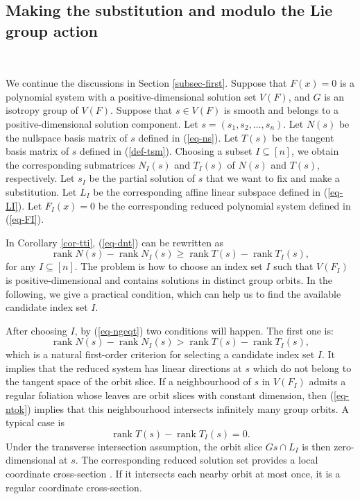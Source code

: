 \documentclass[reqno]{amsart}
\theoremstyle{definition}
\numberwithin{equation}{section}
\theoremstyle{remark}
\newcounter{condition}
\begin{document}
\subsection{Making the substitution and modulo the Lie group action}
\label{subsec-ntmethod}
\

We continue the discussions in Section \ref{subsec-first}. Suppose that
$F(x)=0$ is a polynomial system with a positive-dimensional solution set
$V(F)$, and $G$ is an isotropy group of $V(F)$. Suppose that $s\in V(F)$ is smooth and belongs to a positive-dimensional solution component. Let $s=(s_1,s_2,\ldots,s_n)$. Let $N(s)$ be the nullspace basis matrix of $s$ defined in (\ref{eq-ns}). Let $T(s)$ be the tangent basis matrix of $s$ defined in (\ref{def-tsm}). Choosing a subset $I\subseteq [n]$, we obtain the corresponding submatrices $N_I(s)$ and $T_I(s)$ of  $N(s)$ and $T(s)$, respectively. Let $s_I$ be the partial solution of $s$ that we want to fix and make a substitution. Let $L_I$ be the corresponding affine linear subspace defined in (\ref{eq-LI}). Let $F_I(x)=0$ be the corresponding reduced polynomial system defined in (\ref{eq-FI}).

In Corollary \ref{cor-tti}, (\ref{eq-dnt}) can be rewritten as 
\begin{equation}\label{eq-ngeqt}
\operatorname{rank}N(s)-\operatorname{rank}N_I(s)\geq \operatorname{rank}T(s)-\operatorname{rank}T_I(s),
\end{equation}
for any $I\subseteq [n]$. The problem is how to choose an index set $I$ such that $V(F_I)$ is positive-dimensional and contains solutions in distinct group orbits. In the following, we give a practical condition, which can help us to find the available candidate index set $I$.

After choosing $I$, by (\ref{eq-ngeqt}) two conditions will happen. The first one is:
\begin{equation}\label{eq-ntok}
\operatorname{rank}N(s)-\operatorname{rank}N_I(s)>\operatorname{rank}T(s)-\operatorname{rank}T_I(s),
\end{equation}
which is a natural first-order criterion for selecting a candidate index set
$I$. It implies that the reduced system has linear directions at $s$
which do not belong to the tangent space of the orbit slice.
If a neighbourhood of $s$ in $V(F_I)$ admits a regular foliation
whose leaves are orbit slices with constant dimension, then
(\ref{eq-ntok}) implies that this neighbourhood intersects infinitely many group orbits. A typical case is
\begin{equation*} 
\operatorname{rank}T(s)-\operatorname{rank}T_I(s)=0.
\end{equation*}
Under the transverse intersection assumption, the orbit slice $Gs\cap L_I$
is then zero-dimensional at $s$. The corresponding reduced solution
set provides a local coordinate cross-section \cite{Hubert07sa,Kogan23inv,olver12mf}. If it intersects each nearby orbit at most once, it is a regular coordinate cross-section.
\end{document}
